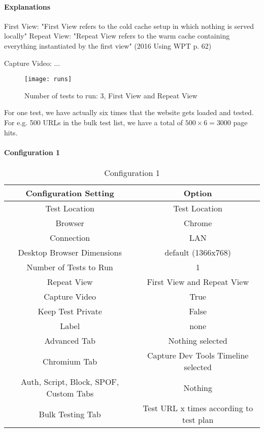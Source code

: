 \paragraph{Explanations}

First View: "First View refers to the cold cache setup in which nothing is served locally"
Repeat View: "Repeat View refers to the warm cache containing everything instantiated by the first view"
(2016 Using WPT p. 62)

Capture Video: ...

\begin{figure}[h!]
  \caption{Number of tests to run: 3, First View and Repeat View}
  \texttt{[image: runs]}
\end{figure}

For one test, we have actually six times that the website gets loaded and tested.
For e.g. 500 URLs in the bulk test list, we have a total of $500 \times 6 = 3000$ page hits.


\paragraph{Configuration 1}

\begin{table}[h]
	\caption[Test Runs]{Configuration 1}
	\label{tab:tamodelleVergleich}
	\centering
	\begin{tabular}{ |c|c| } 
	\hline
	Configuration Setting & Option \\
	\hline
	Test Location & Test Location \\ 
	Browser & Chrome \\
	\hline
	Connection & LAN \\
	Desktop Browser Dimensions & default (1366x768) \\
	Number of Tests to Run & 1 \\
	Repeat View & First View and Repeat View \\
	Capture Video & True \\
	Keep Test Private & False \\
	Label & none \\
	\hline	  
	Advanced Tab & Nothing selected \\
	Chromium Tab & Capture Dev Tools Timeline selected  \\
	Auth, Script, Block, SPOF, Custom Tabs & Nothing  \\
	Bulk Testing Tab & Test URL x times according to test plan \\
	\hline
	\end{tabular}
\end{table}

